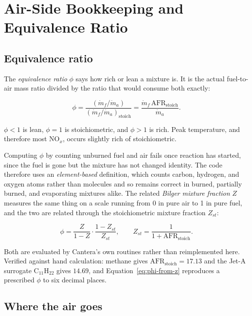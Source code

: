 \documentclass[11pt]{article}
\begin{document}
\section{Air-Side Bookkeeping and Equivalence Ratio}

\subsection{Equivalence ratio}

The \emph{equivalence ratio} $\phi$ says how rich or lean a mixture is. It is the actual
fuel-to-air mass ratio divided by the ratio that would consume both exactly:

\begin{equation}
  \phi=\frac{\left(\dot m_{f}/\dot m_{a}\right)}
            {\left(\dot m_{f}/\dot m_{a}\right)_{\mathrm{stoich}}}
       =\frac{\dot m_{f}\,\mathrm{AFR}_{\mathrm{stoich}}}{\dot m_{a}}.
  \label{eq:equivalence-ratio}
\end{equation}

$\phi<1$ is lean, $\phi=1$ is stoichiometric, and $\phi>1$ is rich. Peak temperature, and
therefore most NO$_x$, occurs slightly rich of stoichiometric.

Computing $\phi$ by counting unburned fuel and air fails once reaction has started, since
the fuel is gone but the mixture has not changed identity. The code therefore uses an
\emph{element-based} definition, which counts carbon, hydrogen, and oxygen atoms rather
than molecules and so remains correct in burned, partially burned, and evaporating
mixtures alike. The related \emph{Bilger mixture fraction} $Z$ measures the same thing on
a scale running from 0 in pure air to 1 in pure fuel, and the two are related through the
stoichiometric mixture fraction $Z_{st}$:

\begin{equation}
  \phi=\frac{Z}{1-Z}\cdot\frac{1-Z_{st}}{Z_{st}},
  \qquad Z_{st}=\frac{1}{1+\mathrm{AFR}_{\mathrm{stoich}}}.
  \label{eq:phi-from-z}
\end{equation}

Both are evaluated by Cantera's own routines rather than reimplemented here. Verified
against hand calculation: methane gives $\mathrm{AFR}_{\mathrm{stoich}}=17.13$ and the
Jet-A surrogate C$_{11}$H$_{22}$ gives $14.69$, and Equation~\eqref{eq:phi-from-z}
reproduces a prescribed $\phi$ to six decimal places.

\subsection{Where the air goes}
\end{document}
